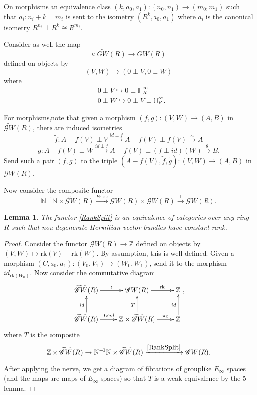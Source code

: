 \documentclass[edeposit,fullpage]{uiucthesis2009}
\newcommand{\Z}{\mathbb Z}
\newcommand{\mbb}{\mathbb}
\theoremstyle{plain}
\newtheorem{lemma}{Lemma}
\numberwithin{lemma}{section}
\theoremstyle{definition}
\begin{document}
On morphisms an equivalence class $(k,a_0,a_1) : (n_0,n_1) \rightarrow
(m_0,m_1)$ such that $a_i : n_i + k = m_i$ is sent to the isometry
$(R^k,a_0,a_1)$ where  $a_i$ is the canonical isometry  $R^{n_i} \perp R^k \cong R^{m_i}$.

Consider as well the map 
\[
\iota: \widetilde{GW}(R) \rightarrow GW(R)
\]
 defined
on objects by
\[
(V,W) \mapsto (0 \perp V,0 \perp W)
\]
where
\begin{align*}
&0 \perp V \hookrightarrow 0 \perp \mbb H^\infty_R \\
&0 \perp W \hookrightarrow 0 \perp
V \perp \mbb H^\infty_R.
\end{align*}

For morphisms,note that given a morphism $(f,g) : (V,W) \rightarrow
(A,B)$ in $\widetilde{\mathscr GW}(R)$, there are induced isometries
\[
\widetilde{f} : A-f(V) \perp V \xrightarrow{id \perp f} A-f(V) \perp
f(V) \xrightarrow{\sim} A
\]
\[
\widetilde{g} : A-f(V) \perp W \xrightarrow{id \perp f} A-f(V) \perp (f \perp id)(W)
\xrightarrow{g} B.
\]  
Send such a pair $(f,g)$ to the triple $(A-f(V),\widetilde f,
\widetilde g) : (V,W) \rightarrow (A,B)$ in $\mathscr GW(R)$.


Now consider the composite functor
\begin{equation}\label{RankSplit}
\mbb N^{-1} \mbb N \times \widetilde{\mathscr GW}(R) \xrightarrow{Fr
  \times \iota}\mathscr GW(R) \times \mathscr GW(R)
\xrightarrow{\perp} \mathscr GW(R).
\end{equation}

\begin{lemma}
The functor \eqref{RankSplit} is an equivalence of categories over any
ring $R$ such that non-degenerate Hermitian vector bundles have
constant rank. 
\end{lemma}

\begin{proof}
Consider the functor $\mathscr GW(R) \rightarrow \Z$
defined on objects by $(V,W) \mapsto
\mathrm{rk}(V)-\mathrm{rk}(W)$. By assumption, this is well-defined. Given a morphism $(C,a_0,a_1) :
(V_0,V_1) \rightarrow (W_0,W_1)$, send it to the morphism
$id_{\mathrm{rk}(W_0)}$. Now consider the commutative diagram
\[
\xymatrix{\widetilde{\mathscr GW}(R) \ar[r]^{\iota} & \mathscr GW(R)
\ar[r]^-{\mathrm{rk}} & \Z \\ \widetilde{\mathscr GW}(R) \ar[u]^{id}
\ar[r]^-{0 \times id} & \Z \times \widetilde{\mathscr GW}(R) \ar[u]^{T} \ar[r]^-{\pi_\Z} & \Z \ar[u]^{id}},
\]
where $T$ is the composite
\[
\Z \times \widetilde{\mathscr GW}(R) \rightarrow 
  \mbb N^{-1}\mbb N \times  \widetilde{\mathscr GW}(R)  \xrightarrow{\eqref{RankSplit}} \mathscr GW(R).
\]

After applying the nerve, we get a diagram of fibrations of grouplike $E_\infty$ spaces (and the
maps are maps of $E_\infty$ spaces) so that $T$ is a weak equivalence
by the 5-lemma. 
\end{proof}
\end{document}
